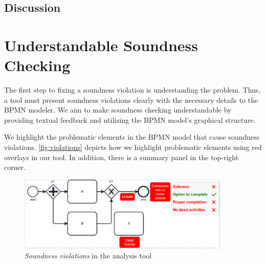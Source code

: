 \documentclass[runningheads]{llncs}
\begin{document}
\subsection{Discussion}


\section{Understandable Soundness Checking}

The first step to fixing a soundness violation is understanding the problem.
Thus, a tool must present soundness violations clearly with the necessary details to the BPMN modeler.
We aim to make soundness checking understandable by providing textual feedback and utilizing the BPMN model's graphical structure.

We highlight the problematic elements in the BPMN model that cause soundness violations.
\autoref{fig:violations} depicts how we highlight problematic elements using red overlays in our tool.
In addition, there is a summary panel in the top-right corner.

\begin{figure}[ht]
	\centering
	\includegraphics[width=0.9\textwidth]{images/violations}
	\caption{\textit{Soundness violations} in the analysis tool}
	\label{fig:violations}
\end{figure}
\end{document}
